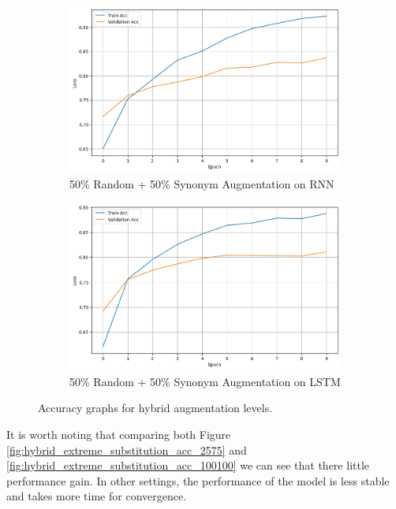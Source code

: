 \documentclass[10pt]{extarticle}
\begin{document}
\begin{figure}[ht]
  \centering
  \begin{subfigure}[b]{0.45\textwidth}
    \includegraphics[width=\textwidth]{img/hybrid_100_rnn.png}
    \caption{50\% Random + 50\% Synonym Augmentation on RNN}
    \label{fig:hybrid_100_rnn}
  \end{subfigure}
  \hfill
  \begin{subfigure}[b]{0.45\textwidth}
    \includegraphics[width=\textwidth]{img/hybrid_100_lstm.png}
    \caption{50\% Random + 50\% Synonym Augmentation on LSTM}
    \label{fig:hybrid_100_lstm}
  \end{subfigure}
  \caption{Accuracy graphs for hybrid augmentation levels.}
  \label{fig:hybrid_extreme_substitution_acc_5050}
\end{figure}

It is worth noting that comparing both Figure
\ref{fig:hybrid_extreme_substitution_acc_2575} and
\ref{fig:hybrid_extreme_substitution_acc_100100} we can see that there little
performance gain. In other settings, the performance of the model is less
stable and takes more time for convergence.
\end{document}
